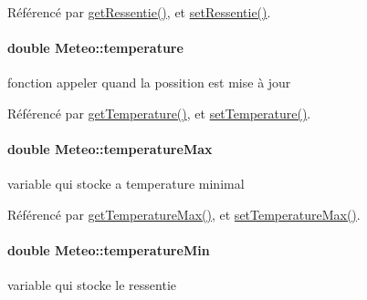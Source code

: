 Référencé par \hyperlink{class_meteo_a7bcbc6280fb91ff28436e84f7d8765e7}{get\+Ressentie()}, et \hyperlink{class_meteo_a73283bb2c6aa7bc205b0490cfb6ddf08}{set\+Ressentie()}.

\paragraph[{\texorpdfstring{temperature}{temperature}}]{\setlength{\rightskip}{0pt plus 5cm}double Meteo\+::temperature\hspace{0.3cm}{\ttfamily [private]}}\hypertarget{class_meteo_a8086970687d7df655f68775bc0852178}{}\label{class_meteo_a8086970687d7df655f68775bc0852178}
fonction appeler quand la possition est mise à jour 

Référencé par \hyperlink{class_meteo_ad0a7466f4371df14623fd03fa0bab8dd}{get\+Temperature()}, et \hyperlink{class_meteo_a7e15015233ae155d482e414804c4b381}{set\+Temperature()}.

\paragraph[{\texorpdfstring{temperature\+Max}{temperatureMax}}]{\setlength{\rightskip}{0pt plus 5cm}double Meteo\+::temperature\+Max\hspace{0.3cm}{\ttfamily [private]}}\hypertarget{class_meteo_a5dd5312470d767714779344a524fd27b}{}\label{class_meteo_a5dd5312470d767714779344a524fd27b}
variable qui stocke a temperature minimal 

Référencé par \hyperlink{class_meteo_a114aadb20b0b56c1fe8a6fc2dd19c02b}{get\+Temperature\+Max()}, et \hyperlink{class_meteo_a1737d7a11c9bf4326071531acfcc3243}{set\+Temperature\+Max()}.

\paragraph[{\texorpdfstring{temperature\+Min}{temperatureMin}}]{\setlength{\rightskip}{0pt plus 5cm}double Meteo\+::temperature\+Min\hspace{0.3cm}{\ttfamily [private]}}\hypertarget{class_meteo_a640f1543a82502057c333eed2c2b049e}{}\label{class_meteo_a640f1543a82502057c333eed2c2b049e}
variable qui stocke le ressentie 

